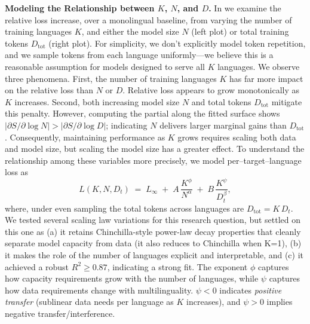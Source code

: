 \noindent\textbf{Modeling the Relationship between $K$, $N$, and $D$.} 
In  we examine the relative loss increase, over a monolingual baseline, from varying the number of training languages $K$, and either the model size $N$ (left plot) or total training tokens $D_{\mathrm{tot}}$ (right plot).
For simplicity, we don't explicitly model token repetition, and we sample tokens from each language uniformly---we believe this is a reasonable assumption for models designed to serve all $K$ languages.
We observe three phenomena.
First, the number of training languages $K$ has far more impact on the relative loss than $N$ or $D$.
Relative loss appears to grow monotonically as $K$ increases.
Second, both increasing model size $N$ and total tokens $D_{\mathrm{tot}}$ mitigate this penalty.
However, computing the partial along the fitted surface shows $|\partial S/\partial\log N| > |\partial S/\partial\log D|$; indicating $N$ delivers larger marginal gains than $D_{\mathrm{tot}}$.
Consequently, maintaining performance as $K$ grows requires scaling both data and model size, but scaling the model size has a greater effect.
To understand the relationship among these variables more precisely, we model per--target--language loss as
\[
L(K,N,D_{t})\;=\;L_\infty \;+\; A\,\frac{K^{\phi}}{N^{\alpha}}
\;+\; B\,\frac{K^{\psi}}{D_{t}^{\beta}},
\]
where, under even sampling the total tokens across languages are \(D_{\mathrm{tot}} = K\,D_{t}\).
We tested several scaling law variations for this research question, but settled on this one as (a) it retains Chinchilla-style power-law decay properties that cleanly separate model capacity from data (it also reduces to Chinchilla when K=1), (b) it makes the role of the number of languages explicit and interpretable, and (c) it achieved a robust $R^2\ge0.87$, indicating a strong fit.
The exponent \(\phi\) captures how capacity requirements grow with the number of languages, while \(\psi\) captures how data requirements change with multilinguality. \(\psi<0\) indicates \emph{positive transfer} (sublinear data needs per language as \(K\) increases), and \(\psi>0\) implies negative transfer/interference.



